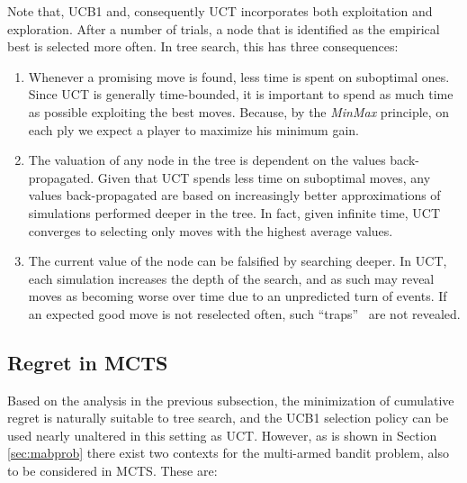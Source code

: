 \documentclass{kecsmstr}
\begin{document}
Note that, UCB1 and, consequently UCT incorporates both exploitation and exploration. After a number of trials, a node that is identified as the empirical best is selected more often. In tree search, this has three consequences:
\begin{enumerate} 
\item Whenever a promising move is found, less time is spent on suboptimal ones. Since UCT is generally time-bounded, it is important to spend as much time as possible exploiting the best moves. Because, by the \emph{MinMax} principle, on each ply we expect a player to maximize his minimum gain. 

\item The valuation of any node in the tree is dependent on the values back-propagated. Given that UCT spends less time on suboptimal moves, any values back-propagated are based on increasingly better approximations of simulations performed deeper in the tree. In fact, given infinite time, UCT converges to selecting only moves with the highest average values.

\item The current value of the node can be falsified by searching deeper. In UCT, each simulation increases the depth of the search, and as such may reveal moves as becoming worse over time due to an unpredicted turn of events. If an expected good move is not reselected often, such ``traps''~ are not revealed.
\end{enumerate}

\subsection{Regret in MCTS}

Based on the analysis in the previous subsection, the minimization of cumulative regret is naturally suitable to tree search, and the UCB1 selection policy can be used nearly unaltered in this setting as UCT. However, as is shown in Section \ref{sec:mabprob} there exist two contexts for the multi-armed bandit problem, also to be considered in MCTS. These are:
\end{document}
